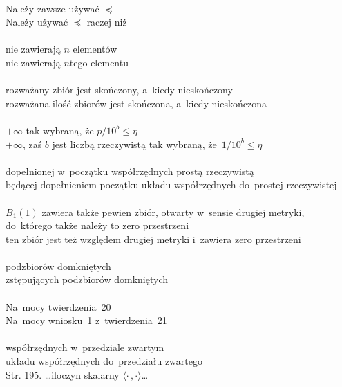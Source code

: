 \documentclass[a4paper,11pt]{article}
\begin{document}
\noi
{} \\
\Jest Należy zawsze używać $\preceq$ \\
\Pow Należy używać $\preceq$ raczej niż \\
 \\
\Jest nie zawierają $n$ elementów \\
\Pow nie zawierają $n$\dywiz tego elementu \\
 \\
\Jest rozważany zbiór jest skończony, a~kiedy nieskończony \\
\Pow rozważana ilość zbiorów jest skończona, a~kiedy nieskończona \\
 \\
\Jest $+\infty$ tak wybraną, że $p / 10^{ b } \leq \eta$ \\
$+\infty$, zaś $b$ jest liczbą rzeczywistą tak wybraną,
że~$1 / 10^{ b } \leq \eta$ \\
 \\
\Jest dopełnionej w~początku współrzędnych prostą rzeczywistą \\
\Pow będącej dopełnieniem początku układu współrzędnych do~prostej rzeczywistej \\
 \\
\Jest $B_{ 1 }( 1 )$ zawiera także pewien zbiór, otwarty w~sensie drugiej metryki, do~którego także należy to zero przestrzeni \\
\Pow ten zbiór jest też względem drugiej metryki i~zawiera zero przestrzeni \\ %
 \\
\Jest podzbiorów domkniętych \\
\Pow zstępujących podzbiorów domkniętych \\
 \\
\Jest Na~mocy twierdzenia~20 \\
\Pow Na~mocy wniosku~1 z~twierdzenia~21 \\
 \\
\Jest współrzędnych w~przedziale zwartym \\
\Pow układu współrzędnych do~przedziału zwartego \\








\start Str. 195. \ldots iloczyn skalarny
$\langle \cdot \,, \cdot \rangle$\ldots
\end{document}
